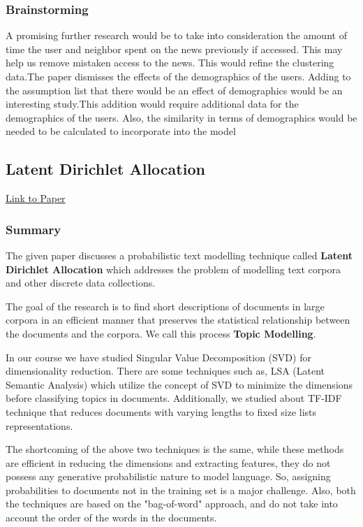 \documentclass{article}
\begin{document}
\subsubsection{Brainstorming}
A promising further research would be to take into consideration the amount of time the user and neighbor spent on the news previously if accessed. This may help us remove mistaken access to the news. This would refine the clustering data.The paper dismisses the effects of the demographics of the users. Adding to the assumption list that there would be an effect of demographics would be an interesting study.This addition would require additional data for the demographics of the users. Also, the similarity in terms of demographics would be needed to be calculated to incorporate into the model

\subsection{Latent Dirichlet Allocation}
\href{http://www.jmlr.org/papers/volume3/blei03a/blei03a.pdf2}{Link to Paper}

\subsubsection{Summary}
The given paper discusses a probabilistic text modelling technique called \textbf{Latent Dirichlet Allocation} which addresses the problem of modelling text corpora and other discrete data collections. 

The goal of the research is to find short descriptions of documents in large corpora in an efficient manner that preserves the statistical relationship between the documents and the corpora. We call this process \textbf{Topic Modelling}.

In our course we have studied Singular Value Decomposition (SVD) for dimensionality reduction. There are some techniques such as, LSA (Latent Semantic Analysis) which utilize the concept of SVD to minimize the dimensions before classifying topics in documents. Additionally, we studied about TF-IDF technique that reduces documents with varying lengths to fixed size lists representations. 

The shortcoming of the above two techniques is the same, while these methods are efficient in reducing the dimensions and extracting features, they do not possess any generative probabilistic nature to model language. So, assigning probabilities to documents not in the training set is a major challenge. Also, both the techniques are based on the "bag-of-word" approach, and do not take into account the order of the words in the documents. 
\end{document}
